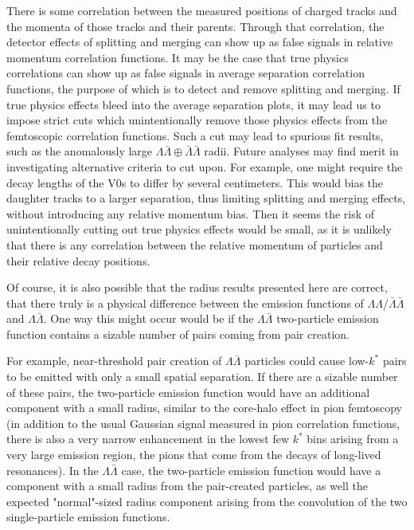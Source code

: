 There is some correlation between the measured positions of charged tracks and the momenta of those tracks and their parents.
Through that correlation, the detector effects of splitting and merging can show up as false signals in relative momentum correlation functions.
It may be the case that true physics correlations can show up as false signals in average separation correlation functions, the purpose of which is to detect and remove splitting and merging.
If true physics effects bleed into the average separation plots, it may lead us to impose strict cuts which unintentionally remove those physics effects from the femtoscopic correlation functions.
Such a cut may lead to spurious fit results, such as the anomalously large $\Lambda\bar{\Lambda}\oplus\bar{\Lambda}\bar{\Lambda}$ radii.
Future analyses may find merit in investigating alternative criteria to cut upon.
For example, one might require the decay lengths of the V0s to differ by several centimeters.
This would bias the daughter tracks to a larger separation, thus limiting splitting and merging effects, without introducing any relative momentum bias.
Then it seems the risk of unintentionally cutting out true physics effects would be small, as it is unlikely that there is any correlation between the relative momentum of particles and their relative decay positions.

Of course, it is also possible that the radius results presented here are correct, that there truly is a physical difference between the emission functions of $\Lambda\Lambda$/$\bar{\Lambda}\bar{\Lambda}$ and $\Lambda\bar{\Lambda}$.
One way this might occur would be if the $\Lambda\bar{\Lambda}$ two-particle emission function contains a sizable number of pairs coming from pair creation.

For example, near-threshold pair creation of $\Lambda\bar{\Lambda}$ particles could cause low-$k^*$ pairs to be emitted with only a small spatial separation.
If there are a sizable number of these pairs, the two-particle emission function would have an additional component with a small radius, similar to the core-halo effect in pion femtoscopy (in addition to the usual Gaussian signal measured in pion correlation functions, there is also a very narrow enhancement in the lowest few $k^*$ bins arising from a very large emission region, the pions that come from the decays of long-lived resonances).
In the $\Lambda\bar{\Lambda}$ case, the two-particle emission function would have a component with a small radius from the pair-created particles, as well the expected "normal"-sized radius component arising from the convolution of the two single-particle emission functions.

